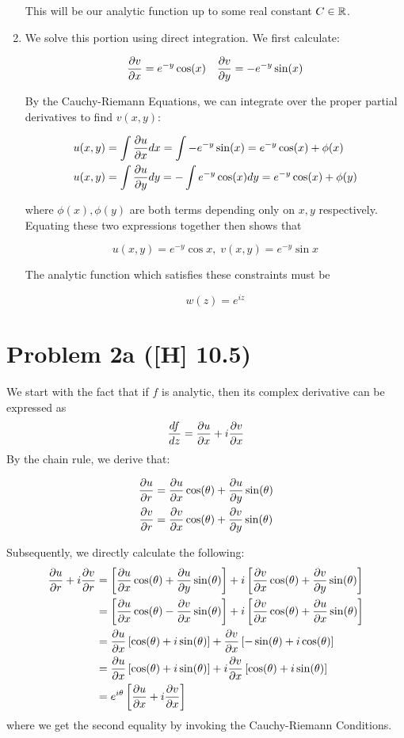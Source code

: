 \documentclass[12pt]{article}%
\begin{document}
\begin{enumerate}
    This will be our analytic function up to some real constant $C \in {\mathbb{R}}$.

    \item We solve this portion using direct integration. We first calculate:

    \[ \frac{\partial{v}}{\partial{x}} = e^{-y}\cos(x) \quad \frac{\partial{v}}{\partial{y}} = -e^{-y}\sin(x) \]

    By the Cauchy-Riemann Equations, we can integrate over the proper partial derivatives to find $v(x,y)$:

    \begin{align*}
      u(x,y) & = \int \frac{\partial{u}}{\partial{x}} dx = \int -e^{-y}\sin(x) = e^{-y}\cos(x) + \phi(x) \\
      u(x,y) & = \int \frac{\partial{u}}{\partial{y}} dy = - \int e^{-y}\cos(x) dy = e^{-y}\cos(x) + \phi(y)
    \end{align*}

    where $\phi(x), \phi(y)$ are both terms depending only on $x,y$ respectively. Equating these two expressions together then shows that

    \[ u(x,y) =  e^{-y}\cos{x}, \; v(x,y) = e^{-y}\sin{x}\]

    The analytic function which satisfies these constraints must be

    \[ w(z) = e^{iz} \]
\end{enumerate}

\section{Problem 2a ([H] 10.5)}

We start with the fact that if $f$ is analytic, then its complex derivative can be expressed as \[\frac{d{f}}{d{z}} = \frac{\partial{u}}{\partial{x}} + i\frac{\partial{v}}{\partial{x}}\]
%
By the chain rule, we derive that:

\begin{align}
  \frac{\partial{u}}{\partial{r}} & = \frac{\partial{u}}{\partial{x}} \cos(\theta) + \frac{\partial{u}}{\partial{y}}\sin(\theta) \label{eq:urRel}\\
  \frac{\partial{v}}{\partial{r}} & = \frac{\partial{v}}{\partial{x}} \cos(\theta) + \frac{\partial{v}}{\partial{y}}\sin(\theta) \label{eq:uvRel}
\end{align}

Subsequently, we directly calculate the following:
\begin{align*}
  \frac{\partial{u}}{\partial{r}} + i\frac{\partial{v}}{\partial{r}} & = \left[\frac{\partial{u}}{\partial{x}} \cos(\theta) + \frac{\partial{u}}{\partial{y}}\sin(\theta)\right] + i\left[\frac{\partial{v}}{\partial{x}} \cos(\theta) + \frac{\partial{v}}{\partial{y}}\sin(\theta)\right] \\
  & = \left[\frac{\partial{u}}{\partial{x}} \cos(\theta) - \frac{\partial{v}}{\partial{x}}\sin(\theta)\right] + i\left[\frac{\partial{v}}{\partial{x}} \cos(\theta) + \frac{\partial{u}}{\partial{x}}\sin(\theta)\right] \\
  & = \frac{\partial{u}}{\partial{x}}\left[\cos(\theta) + i\sin(\theta)\right] + \frac{\partial{v}}{\partial{x}}\left[-\sin(\theta) + i\cos(\theta)\right] \\
  & = \frac{\partial{u}}{\partial{x}}\left[\cos(\theta) + i\sin(\theta)\right] + i \frac{\partial{v}}{\partial{x}}\left[\cos(\theta) + i\sin(\theta)\right] \\
  & = e^{i\theta}\left[\frac{\partial{u}}{\partial{x}} + i\frac{\partial{v}}{\partial{x}}\right]
\end{align*}
where we get the second equality by invoking the Cauchy-Riemann Conditions.
\end{document}
